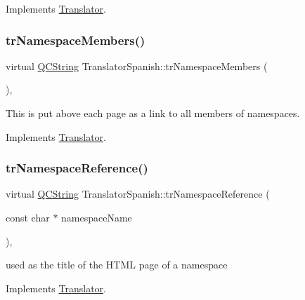 Implements \mbox{\hyperlink{class_translator}{Translator}}.

\mbox{\label{class_translator_spanish_aa5b8d3b4a127c1af5b967fe7a708378d}} 
\subsubsection{\texorpdfstring{trNamespaceMembers()}{trNamespaceMembers()}}
{\footnotesize\ttfamily virtual \mbox{\hyperlink{class_q_c_string}{Q\+C\+String}} Translator\+Spanish\+::tr\+Namespace\+Members (\begin{DoxyParamCaption}{ }\end{DoxyParamCaption})\hspace{0.3cm}{\ttfamily [inline]}, {\ttfamily [virtual]}}

This is put above each page as a link to all members of namespaces. 

Implements \mbox{\hyperlink{class_translator}{Translator}}.

\mbox{\label{class_translator_spanish_a0cfe63390ba0fef102bb3a62a92fb351}} 
\subsubsection{\texorpdfstring{trNamespaceReference()}{trNamespaceReference()}}
{\footnotesize\ttfamily virtual \mbox{\hyperlink{class_q_c_string}{Q\+C\+String}} Translator\+Spanish\+::tr\+Namespace\+Reference (\begin{DoxyParamCaption}\item[{const char $\ast$}]{namespace\+Name }\end{DoxyParamCaption})\hspace{0.3cm}{\ttfamily [inline]}, {\ttfamily [virtual]}}

used as the title of the H\+T\+ML page of a namespace 

Implements \mbox{\hyperlink{class_translator}{Translator}}.

\mbox{\label{class_translator_spanish_a26cb521244af2766778cc557519dd07f}} 
